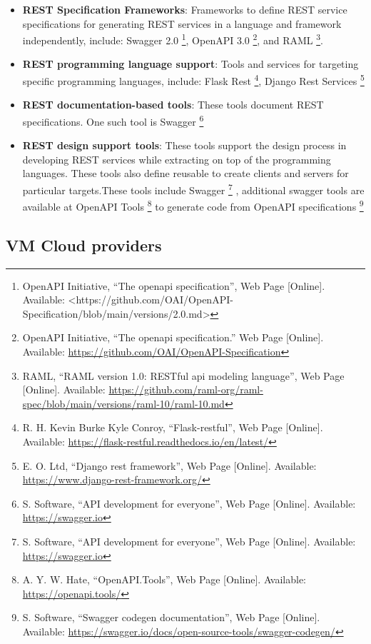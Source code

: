 \begin{itemize}
\tightlist
\item
  \textbf{REST Specification Frameworks}: Frameworks to define REST
  service specifications for generating REST services in a language and
  framework independently, include: Swagger 2.0 \footnote{OpenAPI
    Initiative, ``The openapi specification'', Web Page {[}Online{]}.
    Available: \textless https://github.com/OAI/OpenAPI-
    Specification/blob/main/versions/2.0.md\textgreater{}}, OpenAPI 3.0
  \footnote{OpenAPI Initiative, ``The openapi specification.'' Web Page
    {[}Online{]}. Available:
    \url{https://github.com/OAI/OpenAPI-Specification}}, and RAML
  \footnote{RAML, ``RAML version 1.0: RESTful api modeling language'',
    Web Page {[}Online{]}. Available:
    \url{https://github.com/raml-org/raml-spec/blob/main/versions/raml-10/raml-10.md}}.
\item
  \textbf{REST programming language support}: Tools and services for
  targeting specific programming languages, include: Flask Rest
  \footnote{R. H. Kevin Burke Kyle Conroy, ``Flask-restful'', Web Page
    {[}Online{]}. Available:
    \url{https://flask-restful.readthedocs.io/en/latest/}}, Django Rest
  Services \footnote{E. O. Ltd, ``Django rest framework'', Web Page
    {[}Online{]}. Available:
    \url{https://www.django-rest-framework.org/}}
\item
  \textbf{REST documentation-based tools}: These tools document REST
  specifications. One such tool is Swagger \footnote{S. Software, ``API
    development for everyone'', Web Page {[}Online{]}. Available:
    \url{https://swagger.io}}
\item
  \textbf{REST design support tools}: These tools support the design
  process in developing REST services while extracting on top of the
  programming languages. These tools also define reusable to create
  clients and servers for particular targets.These tools include Swagger
  \footnote{S. Software, ``API development for everyone'', Web Page
    {[}Online{]}. Available: \url{https://swagger.io}} , additional
  swagger tools are available at OpenAPI Tools \footnote{A. Y. W. Hate,
    ``OpenAPI.Tools'', Web Page {[}Online{]}. Available:
    \url{https://openapi.tools/}} to generate code from OpenAPI
  specifications \footnote{S. Software, ``Swagger codegen
    documentation'', Web Page {[}Online{]}. Available:
    \url{https://swagger.io/docs/open-source-tools/swagger-codegen/}}
\end{itemize}

\subsection{VM Cloud providers}\label{vm-cloud-providers}

